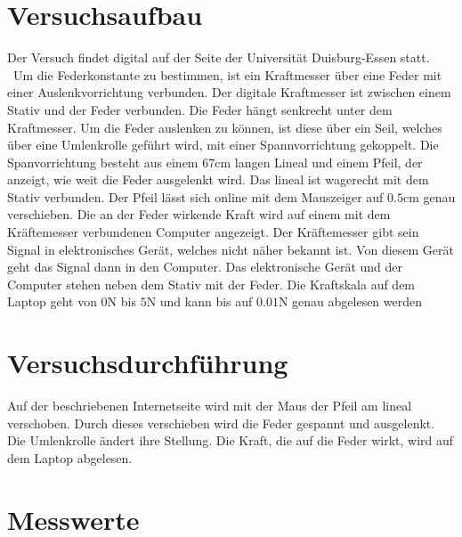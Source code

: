 %

%
\section{Versuchsaufbau}
Der Versuch findet digital auf der Seite der Universität Duisburg-Essen 
\cite{Hook_Interaktiv} statt. \
Um die Federkonstante zu bestimmen, ist ein Kraftmesser über eine Feder mit einer Auslenkvorrichtung verbunden.
Der digitale Kraftmesser ist zwischen einem Stativ und der Feder verbunden. Die Feder hängt senkrecht unter dem Kraftmesser.
Um die Feder auslenken zu können, ist diese über ein Seil, welches über eine Umlenkrolle geführt wird, mit einer 
Spannvorrichtung gekoppelt. Die Spanvorrichtung besteht aus einem $67 \unit{\centi \meter}$ langen Lineal und einem Pfeil, 
der anzeigt, wie weit die Feder ausgelenkt wird. Das lineal ist wagerecht mit dem Stativ verbunden. Der Pfeil lässt sich online 
mit dem Mauszeiger auf $0.5 \unit{\centi \meter}$ genau verschieben. %
Die an der Feder wirkende Kraft wird auf einem mit dem Kräftemesser verbundenen Computer angezeigt. Der Kräftemesser 
gibt sein Signal in elektronisches Gerät, welches nicht näher bekannt ist. Von diesem Gerät geht das Signal dann in den 
Computer. Das elektronische Gerät und der Computer stehen neben dem Stativ mit der Feder. Die Kraftskala auf dem Laptop geht 
von $0 \unit{\newton}$ bis $5 \unit{\newton}$ und kann bis auf $0.01 \unit{\newton}$ genau abgelesen werden


\section{Versuchsdurchführung}
\label{sec:Versuhsdurchfuehrung}
Auf der beschriebenen Internetseite wird mit der Maus der Pfeil am lineal verschoben. Durch dieses verschieben wird die Feder 
gespannt und ausgelenkt. Die Umlenkrolle ändert ihre Stellung. Die Kraft, die auf die Feder wirkt, wird auf dem Laptop 
abgelesen.

\section{Messwerte}
\label{sec:Messwerte}

